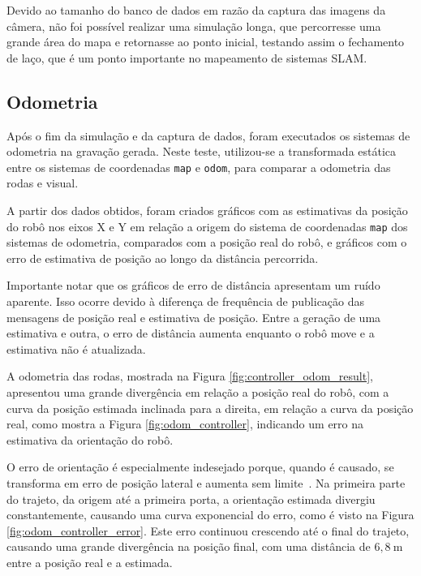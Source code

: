 \documentclass[repeatfields,xlists,xpacks,oneside,yearsonly]{ufrgscca}
\begin{document}
Devido ao tamanho do banco de dados em razão da captura das imagens
da câmera, não foi possível realizar uma simulação longa, que
percorresse uma grande área do mapa e retornasse ao ponto inicial,
testando assim o fechamento de laço, que é um ponto importante no
mapeamento de sistemas SLAM.

\subsection{Odometria}

Após o fim da simulação e da captura de dados, foram executados os
sistemas de odometria na gravação gerada. Neste teste, utilizou-se a
transformada estática entre os sistemas de coordenadas \texttt{map} e
\texttt{odom}, para comparar a odometria das rodas e visual.

A partir dos dados obtidos, foram criados gráficos com as estimativas
da posição do robô nos eixos X e Y em relação a origem do sistema de
coordenadas \texttt{map} dos sistemas de odometria, comparados com a
posição real do robô, e gráficos com o erro de estimativa de posição
ao longo da distância percorrida.

Importante notar que os gráficos de erro de distância apresentam um
ruído aparente. Isso ocorre devido à diferença de frequência de
publicação das mensagens de posição real e estimativa de posição.
Entre a geração de uma estimativa e outra, o erro de distância
aumenta enquanto o robô move e a estimativa não é atualizada.

A odometria das rodas, mostrada na Figura
\ref{fig:controller_odom_result}, apresentou uma grande divergência
em relação a posição real do robô, com a curva da posição estimada
inclinada para a direita, em relação a curva da posição real, como
mostra a Figura \ref{fig:odom_controller}, indicando um erro na
estimativa da orientação do robô.

O erro de orientação é especialmente indesejado porque, quando é
causado, se transforma em erro de posição lateral e aumenta sem
limite~\cite{borenstein}. Na primeira parte do trajeto, da origem até
a primeira porta, a orientação estimada divergiu constantemente,
causando uma curva exponencial do erro, como é visto na Figura
\ref{fig:odom_controller_error}. Este erro continuou crescendo até o
final do trajeto, causando uma grande divergência na posição final,
com uma distância de $6,8~\si{\meter}$ entre a posição real e a
estimada.
\end{document}
